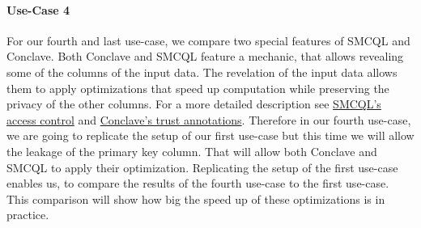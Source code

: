 \paragraph{Use-Case 4}
For our fourth and last use-case, we compare two special features of SMCQL and Conclave. Both Conclave and SMCQL feature a mechanic, that allows revealing some of the columns of the input data. The revelation of the input data allows them to apply optimizations that speed up computation while preserving the privacy of the other columns. For a more detailed description see \hyperref[Accesses_label]{SMCQL's access control} and \hyperref[Trust_label]{Conclave's trust annotations}. Therefore in our fourth use-case, we are going to replicate the setup of our first use-case but this time we will allow the leakage of the primary key column. That will allow both Conclave and SMCQL to apply their optimization. Replicating the setup of the first use-case enables us, to compare the results of the fourth use-case to the first use-case. This comparison will show how big the speed up of these optimizations is in practice. 
















